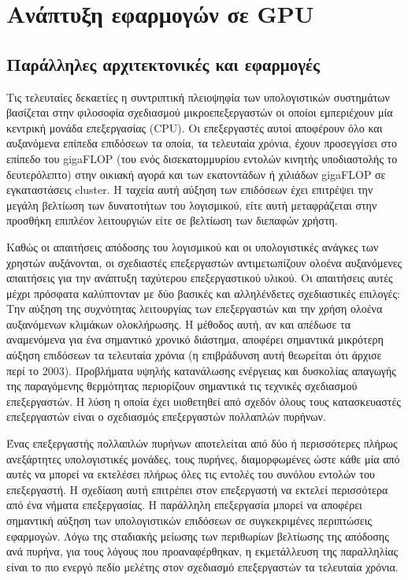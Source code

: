 \chapter{Ανάπτυξη εφαρμογών σε GPU}
\label{chapter:gpgpu}
\section{Παράλληλες αρχιτεκτονικές και εφαρμογές}
\noindent Τις τελευταίες δεκαετίες η συντριπτική πλειοψηφία των υπολογιστικών συστημάτων βασίζεται στην φιλοσοφία σχεδιασμού μικροεπεξεργαστών οι οποίοι εμπεριέχουν μία κεντρική μονάδα επεξεργασίας (CPU). Οι επεξεργαστές αυτοί αποφέρουν όλο και αυξανόμενα επίπεδα επιδόσεων τα οποία, τα τελευταία χρόνια, έχουν προσεγγίσει στο επίπεδο του gigaFLOP (του ενός δισεκατομμυρίου εντολών κινητής υποδιαστολής το δευτερόλεπτο) στην οικιακή αγορά και των εκατοντάδων ή χιλιάδων gigaFLOP σε εγκαταστάσεις cluster. Η ταχεία αυτή αύξηση των επιδόσεων έχει επιτρέψει την μεγάλη βελτίωση των δυνατοτήτων του λογισμικού, είτε αυτή μεταφράζεται στην προσθήκη επιπλέον λειτουργιών είτε σε βελτίωση των διεπαφών χρήστη.

Καθώς οι απαιτήσεις απόδοσης του λογισμικού και οι υπολογιστικές ανάγκες των χρηστών αυξάνονται, οι σχεδιαστές επεξεργαστών αντιμετωπίζουν ολοένα αυξανόμενες απαιτήσεις για την ανάπτυξη ταχύτερου επεξεργαστικού υλικού. Οι απαιτήσεις αυτές μέχρι πρόσφατα καλύπτονταν με δύο βασικές και αλληλένδετες σχεδιαστικές επιλογές: Την αύξηση της συχνότητας λειτουργίας των επεξεργαστών και την χρήση ολοένα αυξανόμενων κλιμάκων ολοκλήρωσης. Η μέθοδος αυτή, αν και απέδωσε τα αναμενόμενα για ένα σημαντικό χρονικό διάστημα, αποφέρει σημαντικά μικρότερη αύξηση επιδόσεων τα τελευταία χρόνια (η επιβράδυνση αυτή θεωρείται ότι άρχισε περί το 2003). Προβλήματα υψηλής κατανάλωσης ενέργειας και δυσκολίας απαγωγής της παραγόμενης θερμότητας περιορίζουν σημαντικά τις τεχνικές σχεδιασμού επεξεργαστών. H λύση η οποία έχει υιοθετηθεί από σχεδόν όλους τους κατασκευαστές επεξεργαστών είναι ο σχεδιασμός επεξεργαστών πολλαπλών πυρήνων.

Ένας επεξεργαστής πολλαπλών πυρήνων αποτελείται από δύο ή περισσότερες  πλήρως ανεξάρτητες υπολογιστικές μονάδες, τους πυρήνες, διαμορφωμένες ώστε κάθε μία από αυτές να μπορεί να εκτελέσει πλήρως όλες τις εντολές του συνόλου εντολών του επεξεργαστή. Η σχεδίαση αυτή επιτρέπει στον επεξεργαστή να εκτελεί περισσότερα από ένα νήματα επεξεργασίας. Η παράλληλη επεξεργασία μπορεί να αποφέρει σημαντική αύξηση των υπολογιστικών επιδόσεων σε συγκεκριμένες περιπτώσεις εφαρμογών. Λόγω της σταδιακής μείωσης των περιθωρίων βελτίωσης της απόδοσης ανά πυρήνα, για τους λόγους που προαναφέρθηκαν, η εκμετάλλευση της παραλληλίας είναι το πιο ενεργό πεδίο μελέτης στον σχεδιασμό επεξεργαστών τα τελευταία χρόνια.

